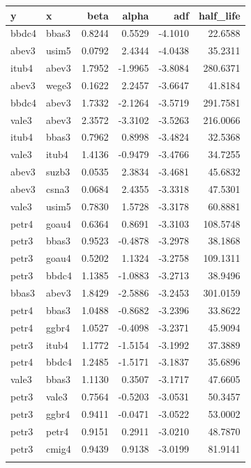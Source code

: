 
\begin{tabular}{llrrrr}
\toprule
y & x & beta & alpha & adf & half\_life\\
\midrule
bbdc4 & bbas3 & 0.8244 & 0.5529 & -4.1010 & 22.6588\\
abev3 & usim5 & 0.0792 & 2.4344 & -4.0438 & 35.2311\\
itub4 & abev3 & 1.7952 & -1.9965 & -3.8084 & 280.6371\\
abev3 & wege3 & 0.1622 & 2.2457 & -3.6647 & 41.8184\\
bbdc4 & abev3 & 1.7332 & -2.1264 & -3.5719 & 291.7581\\
\addlinespace
vale3 & abev3 & 2.3572 & -3.3102 & -3.5263 & 216.0066\\
itub4 & bbas3 & 0.7962 & 0.8998 & -3.4824 & 32.5368\\
vale3 & itub4 & 1.4136 & -0.9479 & -3.4766 & 34.7255\\
abev3 & suzb3 & 0.0535 & 2.3834 & -3.4681 & 45.6832\\
abev3 & csna3 & 0.0684 & 2.4355 & -3.3318 & 47.5301\\
\addlinespace
vale3 & usim5 & 0.7830 & 1.5728 & -3.3178 & 60.8881\\
petr4 & goau4 & 0.6364 & 0.8691 & -3.3103 & 108.5748\\
petr3 & bbas3 & 0.9523 & -0.4878 & -3.2978 & 38.1868\\
petr3 & goau4 & 0.5202 & 1.1324 & -3.2758 & 109.1311\\
petr3 & bbdc4 & 1.1385 & -1.0883 & -3.2713 & 38.9496\\
\addlinespace
bbas3 & abev3 & 1.8429 & -2.5886 & -3.2453 & 301.0159\\
petr4 & bbas3 & 1.0488 & -0.8682 & -3.2396 & 33.8622\\
petr4 & ggbr4 & 1.0527 & -0.4098 & -3.2371 & 45.9094\\
petr3 & itub4 & 1.1772 & -1.5154 & -3.1992 & 37.3889\\
petr4 & bbdc4 & 1.2485 & -1.5171 & -3.1837 & 35.6896\\
\addlinespace
vale3 & bbas3 & 1.1130 & 0.3507 & -3.1717 & 47.6605\\
petr3 & vale3 & 0.7564 & -0.5203 & -3.0531 & 50.3457\\
petr3 & ggbr4 & 0.9411 & -0.0471 & -3.0522 & 53.0002\\
petr3 & petr4 & 0.9151 & 0.2911 & -3.0210 & 48.7870\\
petr3 & cmig4 & 0.9439 & 0.9138 & -3.0199 & 81.9141\\
\addlinespace

\end{tabular}
